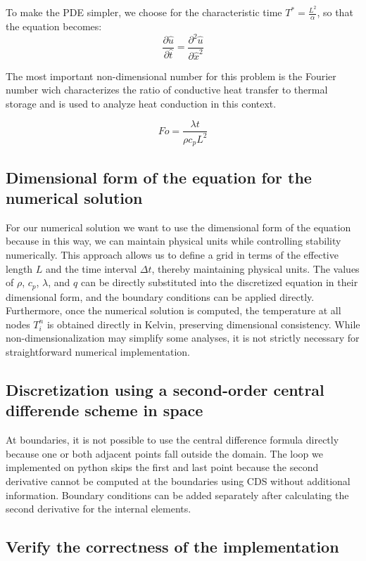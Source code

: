 \documentclass{article}
\begin{document}
To make the PDE simpler, we choose for the characteristic time \( T^* = \frac{L^2}{\alpha}\), so that the equation becomes:
\[
\frac{\partial \hat{u}}{\partial \hat{t}} = \frac{\partial^2 \hat{u}}{\partial \hat{x}^2}
\]

The most important non-dimensional number for this problem is the Fourier number wich characterizes 
the ratio of conductive heat transfer to thermal storage and is used to analyze heat conduction in this context.

\[
Fo = \frac{\lambda t}{\rho c_p L^2}
\]

\subsection{Dimensional form of the equation for the numerical solution}

For our numerical solution we want to use the dimensional form of the equation because in this way, we can maintain physical units while 
controlling stability numerically. This approach allows us to define a grid in terms of the effective length $L$ and the time interval 
$\Delta t$, thereby maintaining physical units. The values of $\rho$, $c_p$, $\lambda$, and $q$ can be directly substituted into 
the discretized equation in their dimensional form, and the boundary conditions can be applied directly. Furthermore, once the numerical 
solution is computed, the temperature at all nodes $T_i^n$ is obtained directly in Kelvin, preserving dimensional consistency. 
While non-dimensionalization may simplify some analyses, it is not strictly necessary for straightforward numerical implementation.

\subsection{Discretization using a second-order central differende scheme in space}

At boundaries, it is not possible to use the central difference formula directly because one or both adjacent points fall outside the domain.
The loop we implemented on python skips the first and last point because the second derivative cannot be computed at the boundaries using CDS
without additional information. Boundary conditions can be added separately after calculating the second derivative for the internal elements.

\subsection{Verify the correctness of the implementation}
\end{document}
